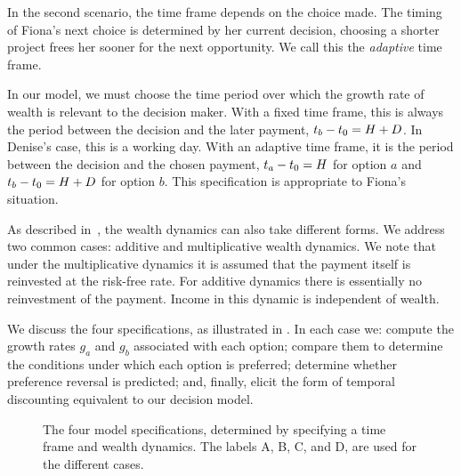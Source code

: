 In the second scenario, the time frame depends on the choice made. The timing of Fiona's next choice is determined by her current decision, \eg choosing a shorter project frees her sooner for the next opportunity. We call this the {\it adaptive} time frame.

In our model, we must choose the time period over which the growth rate of wealth is relevant to the decision maker. With a fixed time frame, this is always the period between the decision and the later payment, \ie $t_b-t_0=H+D$. In Denise's case, this is a working day. With an adaptive time frame, it is the period between the decision and the chosen payment, \ie $t_a-t_0=H$ for option $a$ and $t_b-t_0=H+D$ for option $b$. This specification is appropriate to Fiona's situation.

As described in~, the wealth dynamics can also take different forms. We address two common cases: additive and multiplicative wealth dynamics. We note that under the multiplicative dynamics it is assumed that the payment itself is reinvested at the risk-free rate. For additive dynamics there is essentially no reinvestment of the payment. Income in this dynamic is independent of wealth.

We discuss the four specifications, as illustrated in . In each case we: compute the growth rates $g_a$ and $g_b$ associated with each option; compare them to determine the conditions under which each option is preferred; determine whether preference reversal is predicted; and, finally, elicit the form of temporal discounting equivalent to our decision model.

\begin{figure}[!htb]
\centering
{}
\caption{The four model specifications, determined by specifying a time frame and wealth dynamics. The labels A, B, C, and D, are used for the different cases.}
\end{figure}

